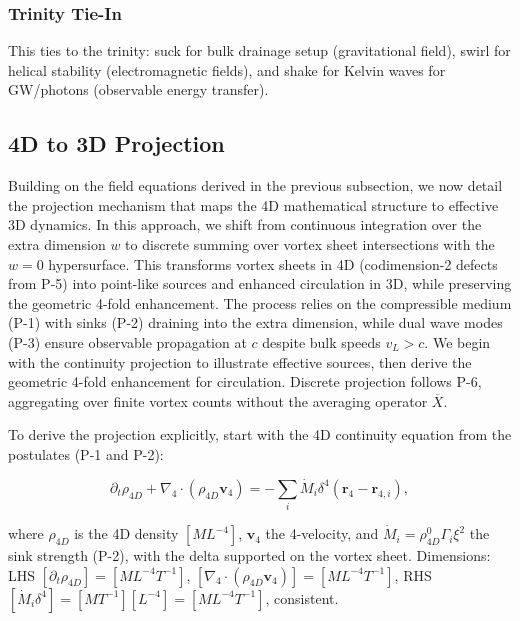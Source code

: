 \subsubsection{Trinity Tie-In}

This ties to the trinity: suck for bulk drainage setup (gravitational field), swirl for helical stability (electromagnetic fields), and shake for Kelvin waves for GW/photons (observable energy transfer).


\subsection{4D to 3D Projection}

Building on the field equations derived in the previous subsection, we now detail the projection mechanism that maps the 4D mathematical structure to effective 3D dynamics. In this approach, we shift from continuous integration over the extra dimension $w$ to discrete summing over vortex sheet intersections with the $w=0$ hypersurface. This transforms vortex sheets in 4D (codimension-2 defects from P-5) into point-like sources and enhanced circulation in 3D, while preserving the geometric 4-fold enhancement. The process relies on the compressible medium (P-1) with sinks (P-2) draining into the extra dimension, while dual wave modes (P-3) ensure observable propagation at $c$ despite bulk speeds $v_L > c$. We begin with the continuity projection to illustrate effective sources, then derive the geometric 4-fold enhancement for circulation. Discrete projection follows P-6, aggregating over finite vortex counts without the averaging operator $\overline{X}$.

To derive the projection explicitly, start with the 4D continuity equation from the postulates (P-1 and P-2):

\begin{equation}
\partial_t \rho_{4D} + \nabla_4 \cdot (\rho_{4D} \mathbf{v}_4) = -\sum_i \dot{M}_i \delta^4(\mathbf{r}_4 - \mathbf{r}_{4,i}),
\end{equation}

where $\rho_{4D}$ is the 4D density $[M L^{-4}]$, $\mathbf{v}_4$ the 4-velocity, and $\dot{M}_i = \rho_{4D}^0 \Gamma_i \xi^2$ the sink strength (P-2), with the delta supported on the vortex sheet. Dimensions: LHS $[\partial_t \rho_{4D}] = [M L^{-4} T^{-1}]$, $[\nabla_4 \cdot (\rho_{4D} \mathbf{v}_4)] = [M L^{-4} T^{-1}]$, RHS $[\dot{M}_i \delta^4] = [M T^{-1}] [L^{-4}] = [M L^{-4} T^{-1}]$, consistent.

